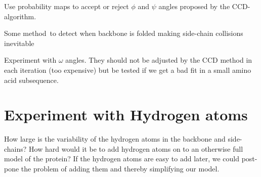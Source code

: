 Use probability maps to accept or reject $\phi$ and $\psi$ angles proposed by the CCD-algorithm.

Some method\texttrademark\ to detect when backbone is folded making side-chain collisions inevitable

Experiment with $\omega$ angles. They should not be adjusted by the CCD method in each iteration (too expensive) but be tested if we get a bad fit in a small amino acid subsequence.

\section{Experiment with Hydrogen atoms}
How large is the variability of the hydrogen atoms in the backbone and
side-chains? How hard would it be to add hydrogen atoms on to an
otherwise full model of the protein? If the hydrogen atoms are easy to
add later, we could post-pone the problem of adding them and thereby
simplifying our model.


